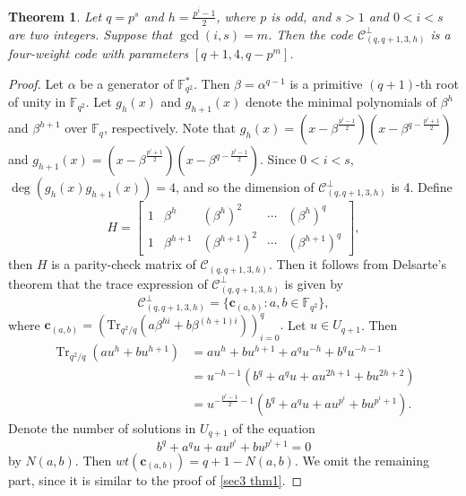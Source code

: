 \documentclass[sn-mathphys-num]{sn-jnl}%
\theoremstyle{thmstyleone}%
\newtheorem{theorem}{Theorem}%
\theoremstyle{thmstyletwo}%
\theoremstyle{thmstylethree}%
\begin{document}
\begin{theorem}\label{sec3 thm4}
	Let $q=p^s$ and $h=\frac{p^i-1}{2}$, where $p$ is odd, and $s>1$ and $0<i<s$ are two integers. Suppose that $\gcd(i,s)=m$. Then the code $\mathcal{C}^\perp_{(q,q+1,3,h)}$ is a four-weight code with parameters $[q+1,4,q-p^m]$.
\end{theorem}
\begin{proof}
	Let $\alpha$ be a generator of $\mathbb{F}_{q^2}^{\ast}$. Then $\beta=\alpha^{q-1}$ is a primitive $(q+1)$-th root of unity in $\mathbb{F}_{q^2}$. Let $g_h(x)$ and $g_{h+1}(x)$ denote the minimal polynomials of $\beta^h$ and $\beta^{h+1}$ over $\mathbb{F}_q$, respectively. Note that $g_h(x)=(x-\beta^{\frac{p^i-1}{2}})(x-\beta^{q-\frac{p^i+1}{2}})$ and $g_{h+1}(x)=(x-\beta^{\frac{p^i+1}{2}})(x-\beta^{q-\frac{p^i-1}{2}})$. Since $0<i<s$, $\deg(g_h(x)g_{h+1}(x))=4$, and so the dimension of $\mathcal{C}^\perp_{(q,q+1,3,h)}$ is 4. Define
	\begin{equation*}
		\left.H=\left[\begin{array}{lllll}1&\beta^{h}&(\beta^{h})^2&\cdots&(\beta^{h})^q\\1&\beta^{h+1}&(\beta^{h+1})^2&\cdots&(\beta^{h+1})^q\end{array}\right.\right],
	\end{equation*}
	then $H$ is a parity-check matrix of $\mathcal{C}_{(q,q+1,3,h)}$. Then it follows from Delsarte’s theorem that the trace expression of $\mathcal{C}_{(q,q+1,3,h)}^{\perp}$ is given by
	\begin{equation*}
		\mathcal{C}_{(q,q+1,3,h)}^\perp=\{\mathbf{c}_{(a,b)}:a,b\in\mathbb{F}_{q^2}\},
	\end{equation*}
	where $\mathbf{c}_{(a,b)}=\left(\mathrm{Tr}_{q^{2}/q}\left(a\beta^{hi}+b\beta^{(h+1)i}\right)\right)_{i=0}^{q}.$ Let $u \in U_{q+1}$. Then 
	\begin{equation}
		\label{sec3 thm4 equ1}
		\begin{aligned}
			\operatorname{Tr}_{q^2/q}(au^h+bu^{h+1})&=au^h+bu^{h+1}+a^qu^{-h}+b^qu^{-h-1}\\&=u^{-h-1}(b^q+a^qu+au^{2h+1}+bu^{2h+2})\\&=u^{-\frac{p^i-1}{2}-1}(b^q+a^qu+au^{p^i}+bu^{p^i+1}).
		\end{aligned}
	\end{equation}
	Denote the number of solutions in $U_{q+1}$ of the equation
	\begin{equation}
		\label{sec3 thm4 equ2}
		b^q+a^qu+au^{p^i}+bu^{p^i+1}=0
	\end{equation}
	by $N(a,b)$. Then $wt(\mathbf{c}_{(a,b)})=q+1-N(a,b)$. We omit the remaining part, since it is similar to the proof of \cref{sec3 thm1}. 
\end{proof}
\end{document}
